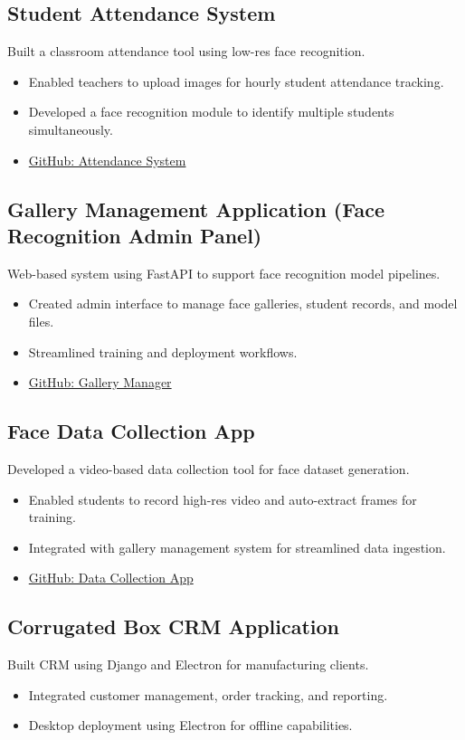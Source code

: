 \documentclass[11pt,a4paper]{article}
\begin{document}
\subsection*{Student Attendance System}
Built a classroom attendance tool using low-res face recognition.
\begin{itemize}[noitemsep]
  \item Enabled teachers to upload images for hourly student attendance tracking.
  \item Developed a face recognition module to identify multiple students simultaneously.
  \item \href{https://github.com/SaiDinakar/Student-Attendance}{GitHub: Attendance System}
\end{itemize}

\subsection*{Gallery Management Application (Face Recognition Admin Panel)}
Web-based system using FastAPI to support face recognition model pipelines.
\begin{itemize}[noitemsep]
  \item Created admin interface to manage face galleries, student records, and model files.
  \item Streamlined training and deployment workflows.
  \item \href{https://github.com/sudo-sidd/Face_Gallery-Manager}{GitHub: Gallery Manager}
\end{itemize}

\subsection*{Face Data Collection App}
Developed a video-based data collection tool for face dataset generation.
\begin{itemize}[noitemsep]
  \item Enabled students to record high-res video and auto-extract frames for training.
  \item Integrated with gallery management system for streamlined data ingestion.
  \item \href{https://github.com/sudo-sidd/Face_Data_Collection-System}{GitHub: Data Collection App}
\end{itemize}

\subsection*{Corrugated Box CRM Application}
Built CRM using Django and Electron for manufacturing clients.
\begin{itemize}[noitemsep]
  \item Integrated customer management, order tracking, and reporting.
  \item Desktop deployment using Electron for offline capabilities.
\end{itemize}
\end{document}
